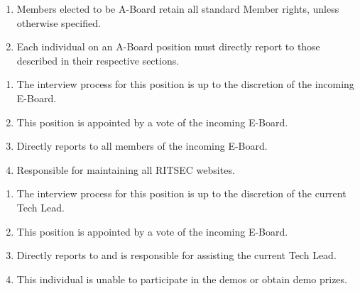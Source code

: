 

\begin{enumerate}
  \item Members elected to be A-Board retain all standard Member rights, unless otherwise specified. 
  \item Each individual on an A-Board position must directly report to those described in their respective sections. 
\end{enumerate}


\begin{enumerate}
  \item The interview process for this position is up to the discretion of the incoming E-Board. 
  \item This position is appointed by a vote of the incoming E-Board.
  \item Directly reports to all members of the incoming E-Board. 
  \item Responsible for maintaining all RITSEC websites.
\end{enumerate}


\begin{enumerate}
  \item The interview process for this position is up to the discretion of the current Tech Lead.
  \item This position is appointed by a vote of the incoming E-Board.
  \item Directly reports to and is responsible for assisting the current Tech Lead.
  \item This individual is unable to participate in the demos or obtain demo prizes.
\end{enumerate}